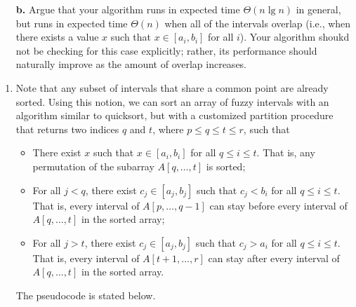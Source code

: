 \documentclass{report}
\makeatletter
\renewenvironment{framed}{%
 \def\FrameCommand##1{\hskip\@totalleftmargin
 \fboxsep=\FrameSep\fbox{##1}}%
 \MakeFramed {\advance\hsize-\width
   \@totalleftmargin\z@ \linewidth\hsize
   \@setminipage}}%
 {\par\unskip\endMakeFramed}
\let\oldnl\nl%
\newcommand{\nonl}{\renewcommand{\nl}{\let\nl\oldnl}}%
\makeatother
\begin{document}
\begin{enumerate}
{\begin{enumerate}
\item[\textbf{b.}]{Argue that your algorithm runs in expected time
$\Theta(n \lg n)$ in general, but runs in expected time $\Theta(n)$ when all of
the intervals overlap (i.e., when there exists a value $x$ such that
$x \in [a_i, b_i]$ for all $i$). Your algorithm shoukd not be checking for this
case explicitly; rather, its performance should naturally improve as the amount
of overlap increases.}
\end{enumerate}
}

\begin{framed}
\begin{enumerate}
\item{
Note that any subset of intervals that share a common point are already sorted.
Using this notion, we can sort an array of fuzzy intervals with an algorithm
similar to quicksort, but with a customized partition procedure that returns two
indices $q$ and $t$, where $p \le q \le t \le r$, such that
\begin{itemize}
\item There exist $x$ such that $x \in [a_i, b_i]$ for all $q \le i \le t$. That
is, any permutation of the subarray $A[q, \dots, t]$ is sorted;
\item For all $j < q$, there exist $c_j \in [a_j, b_j]$ such that $c_j < b_i$
for all $q \le i \le t$. That is, every interval of $A[p, \dots, q - 1]$ can
stay before every interval of $A[q, \dots, t]$ in the sorted array;
\item For all $j > t$, there exist $c_j \in [a_j, b_j]$ such that $c_j > a_i$
for all $q \le i \le t$. That is, every interval of $A[t + 1, \dots, r]$ can
stay after every interval of $A[q, \dots, t]$ in the sorted array.
\end{itemize}

The pseudocode is stated below.

\begin{algorithm}[H]
\SetAlgoNoEnd\DontPrintSemicolon
\BlankLine
{}
\nonl{}
\end{algorithm}

}
\end{enumerate}
\end{framed}
\end{enumerate}
\end{document}
